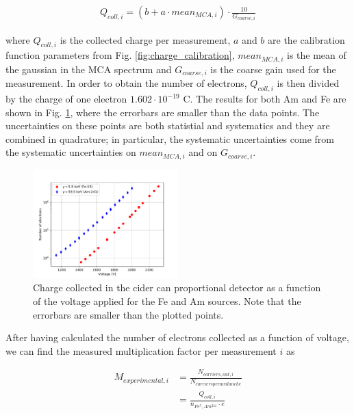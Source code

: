 \begin{adjustwidth}{-1cm}{}
\begin{align}
Q_{coll, i} = (b + a \cdot mean_{MCA, i}) \cdot \frac{10}{G_{coarse, i}} 
\end{align}
\end{adjustwidth}

where $Q_{coll, i}$ is the collected charge per measurement, $a$ and $b$ are the calibration function parameters from Fig. \ref{fig:charge_calibration}, $mean_{MCA, i}$ is the mean of the gaussian in the MCA spectrum and $G_{coarse, i}$ is the coarse gain used for the measurement. In order to obtain the number of electrons, $Q_{coll, i}$ is then divided by the charge of one electron $1.602 \cdot 10^{-19}$ C. The results for both Am and Fe are shown in Fig. \ref{fig:number_of_electrons}, where the errorbars are smaller than the data points. The uncertainties on these points are both statistial and systematics and they are combined in quadrature; in particular, the systematic uncertainties come from the systematic uncertainties on $mean_{MCA, i}$ and on $G_{coarse, i}$.


\begin{figure}[htb]
  \includegraphics[width=0.5\textwidth]{graphics/numbervsvoltage.pdf}
  \caption{Charge collected in the cider can proportional detector as a function of the voltage applied for the Fe and Am sources. Note that the errorbars are smaller than the plotted points.}
  \label{fig:number_of_electrons}
\end{figure}

After having calculated the number of electrons collected as a function of voltage, we can find the measured multiplication factor per measurement $i$ as

\begin{align}
\label{eq:Mexp}
M_{experimental,i} &= \frac{N_{carriers,out,i}}{N_{carriers per avalanche}} \nonumber \\
                   &= \frac{Q_{coll,i}}{n_{Fe^{5},Am^{241}}\cdot e}
\end{align}

